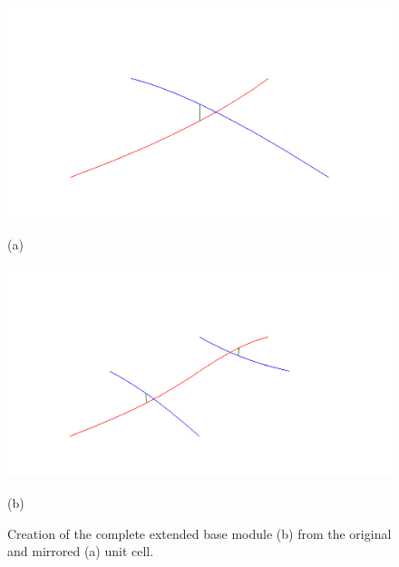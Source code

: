 \begin{figure} [ht]
   \centering
   \begin{makeimage}
   \end{makeimage}
   \begin{latexonly}
	\hspace{0.1cm}
	\begin{minipage} [c] [] [c]{5.5cm} 
	\includegraphics [width =\textwidth] {images/WireStentDemot2Step10}
	\begin{center}
	\vspace{-3ex}
	(a)
	\vspace{1ex}
	\end{center}
\end{minipage}
\hspace{0.3cm}
\begin{minipage} [c] [] [c] {5.5cm}
	\includegraphics [width =\textwidth] {images/WireStentDemot2Step11}
	\begin{center}
	\vspace{-3ex}
	(b)
	\vspace{1ex}
	\end{center}
\end{minipage}
\hspace{0.3cm}
   \end{latexonly}
   \begin{htmlonly}
   \end{htmlonly} 
	\caption {Creation of the complete extended base module (b) from the original and mirrored (a) unit cell.} 
	\label{fig:base}
\end{figure}

